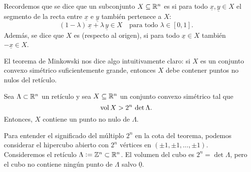 \documentclass{article}
\numberwithin{equation}{section}
\begin{document}
Recordemos que se dice que un subconjunto $X\subseteq \mathbb{R}^n$ es 
si para todo $\underline{x}, \underline{y} \in X$ el segmento de la recta entre
$\underline{x}$ e $\underline{y}$ también pertenece a $X$:
$$(1-\lambda)\,\underline{x} + \lambda\,\underline{y} \in X \quad \text{para todo } \lambda \in [0,1].$$
Además, se dice que $X$ es  (respecto al origen), si para todo
$\underline{x}\in X$ también $-\underline{x}\in X$.

El teorema de Minkowski nos dice algo intuitivamente claro: si $X$ es un
conjunto convexo simétrico suficientemente grande, entonces $X$ debe contener
puntos no nulos del retículo.

\begin{teorema*}[Minkowski]
  Sea $\Lambda \subset \mathbb{R}^n$ un retículo y sea $X \subseteq \mathbb{R}^n$ un conjunto
  convexo simétrico tal que
  $$\operatorname{vol} X > 2^n\,\det \Lambda.$$
  Entonces, $X$ contiene un punto no nulo de $\Lambda$.
\end{teorema*}

\begin{center}
\end{center}

Para entender el significado del múltiplo $2^n$ en la cota del teorema, podemos
considerar el hipercubo abierto con $2^n$ vértices en
$(\pm 1, \pm 1, \ldots, \pm 1)$. Consideremos el retículo
$\Lambda \mathrel{\mathop:}= \mathbb{Z}^n \subset \mathbb{R}^n$. El volumen del cubo es $2^n = \det \Lambda$,
pero el cubo no contiene ningún punto de $\Lambda$ salvo $\underline{0}$.

\begin{center}
\end{center}
\end{document}
